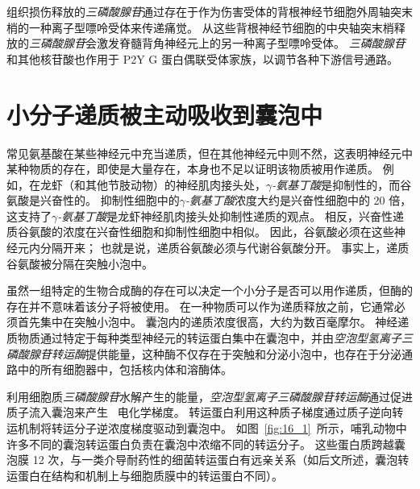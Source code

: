 组织损伤释放的\textit{三磷酸腺苷}通过存在于作为伤害受体的背根神经节细胞外周轴突末梢的一种离子型嘌呤受体来传递痛觉。
从这些背根神经节细胞的中央轴突末梢释放的\textit{三磷酸腺苷}会激发脊髓背角神经元上的另一种离子型嘌呤受体。
\textit{三磷酸腺苷}和其他核苷酸也作用于 P2Y G 蛋白偶联受体家族，以调节各种下游信号通路。



\section{小分子递质被主动吸收到囊泡中}

常见氨基酸在某些神经元中充当递质，但在其他神经元中则不然，这表明神经元中某种物质的存在，即使是大量存在，本身也不足以证明该物质被用作递质。
例如，在龙虾（和其他节肢动物）的神经肌肉接头处，\textit{$\gamma$-氨基丁酸}是抑制性的，而谷氨酸是兴奋性的。
抑制性细胞中的\textit{$\gamma$-氨基丁酸}浓度大约是兴奋性细胞中的 20 倍，这支持了\textit{$\gamma$-氨基丁酸}是龙虾神经肌肉接头处抑制性递质的观点。
相反，兴奋性递质谷氨酸的浓度在兴奋性细胞和抑制性细胞中相似。
因此，谷氨酸必须在这些神经元内分隔开来；
也就是说，递质谷氨酸必须与代谢谷氨酸分开。
事实上，递质谷氨酸被分隔在突触小泡中。


虽然一组特定的生物合成酶的存在可以决定一个小分子是否可以用作递质，但酶的存在并不意味着该分子将被使用。
在一种物质可以作为递质释放之前，它通常必须首先集中在突触小泡中。
囊泡内的递质浓度很高，大约为数百毫摩尔。
神经递质物质通过特定于每种类型神经元的转运蛋白集中在囊泡中，并由\textit{空泡型氢离子三磷酸腺苷转运酶}提供能量，这种酶不仅存在于突触和分泌小泡中，也存在于分泌通路中的所有细胞器中，包括核内体和溶酶体。


利用细胞质\textit{三磷酸腺苷}水解产生的能量，\textit{空泡型氢离子三磷酸腺苷转运酶}通过促进质子流入囊泡来产生~ 电化学梯度。
转运蛋白利用这种质子梯度通过质子逆向转运机制将转运分子逆浓度梯度驱动到囊泡中。
如图~\ref{fig:16_1}~所示，哺乳动物中许多不同的囊泡转运蛋白负责在囊泡中浓缩不同的转运分子。
这些蛋白质跨越囊泡膜 12 次，与一类介导耐药性的细菌转运蛋白有远亲关系（如后文所述，囊泡转运蛋白在结构和机制上与细胞质膜中的转运蛋白不同）。


